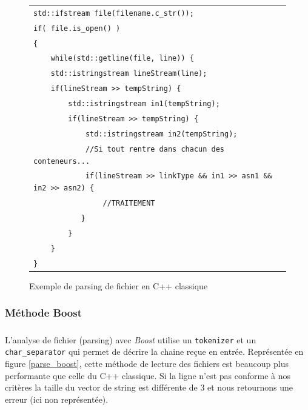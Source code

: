 \begin{figure}[H]
   \begin{center}
      \begin{tabular}{l}
        \hline 
        \verb|std::ifstream file(filename.c_str());|\\
	\verb|if( file.is_open() )|\\
	\verb|{|\\
   	\verb|    while(std::getline(file, line)) {|\\
      	\verb|    std::istringstream lineStream(line);|\\
      	\verb|    if(lineStream >> tempString) {|\\
        \verb|        std::istringstream in1(tempString);|\\
        \verb|        if(lineStream >> tempString) {|\\
        \verb|            std::istringstream in2(tempString);|\\
        \verb|            //Si tout rentre dans chacun des conteneurs...|\\
        \verb|            if(lineStream >> linkType && in1 >> asn1 && in2 >> asn2) {|\\
        \verb|                //TRAITEMENT|\\
        \verb|           }|\\
        \verb|        }|\\
        \verb|    }|\\
        \verb|}|\\
        \hline
      \end{tabular}
   \end{center}
\caption{\label{parse_cpp} Exemple de parsing de fichier en C++ classique}
\end{figure}




\subsubsection{Méthode Boost}
\subparagraph{}
L'analyse de fichier (parsing) avec \textit{Boost} utilise un \verb|tokenizer| et un \verb|char_separator| qui permet de décrire la chaine re\c cue en entrée. Représentée en figure \ref{parse_boost}, cette méthode de lecture des fichiers est beaucoup plus performante que celle du C++ classique. Si la ligne n'est pas conforme à nos critères la taille du vector de string est différente de 3 et nous retournons une erreur (ici non représentée). 

